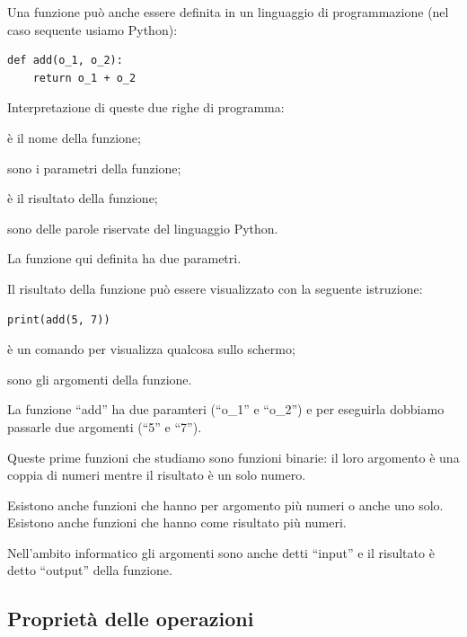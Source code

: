 Una funzione può anche essere definita in un linguaggio di programmazione 
(nel caso sequente usiamo Python):
\begin{lstlisting}
def add(o_1, o_2):
    return o_1 + o_2
\end{lstlisting}
Interpretazione di queste due righe di programma:
\begin{description} [noitemsep]
\item [\textbf{``add''}] è il nome della funzione;
\item [\textbf{``o\_1'' e ``o\_2''}] sono i parametri della funzione; 
\item [\textbf{l'espressione che segue la parola ``return''}] è il risultato
della funzione; 
\item [\textbf{``def'' e ``return''}] sono delle parole riservate del linguaggio
Python.
\end{description}
La funzione qui definita ha due parametri.

Il risultato della funzione può essere visualizzato con la seguente istruzione:
\begin{lstlisting}
print(add(5, 7))
\end{lstlisting}
\begin{description} [noitemsep]
\item [\textbf{``print''}] è un comando per visualizza qualcosa sullo schermo;
\item [\textbf{``5'' e ``7''}] sono gli argomenti della funzione. 
\end{description}
La funzione ``add'' ha due paramteri (``o\_1'' e ``o\_2'') e per eseguirla
dobbiamo passarle due argomenti (``5'' e ``7'').

\begin{osservazione}
Queste prime funzioni che studiamo sono funzioni binarie: il loro argomento è
una coppia di numeri mentre il risultato è un solo numero.

Esistono anche funzioni che hanno per argomento più numeri o anche uno solo.
Esistono anche funzioni che hanno come risultato più numeri.
\end{osservazione}

\begin{osservazione}
Nell'ambito informatico gli argomenti sono anche detti ``input'' e il 
risultato è detto ``output'' della funzione.
\end{osservazione}

\subsection{Proprietà delle operazioni}

